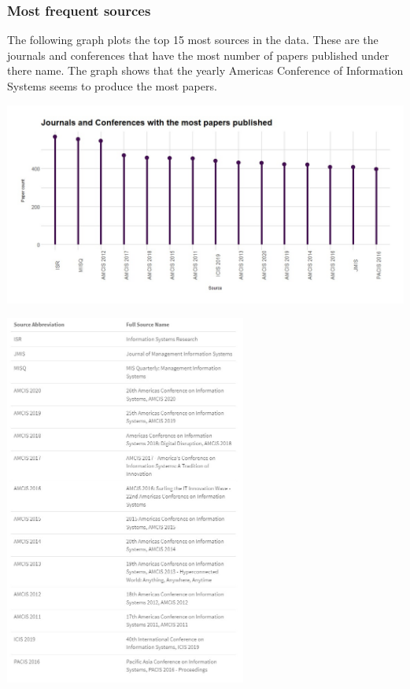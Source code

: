 \documentclass[
  letterpaper,
  DIV=11,
  numbers=noendperiod]{scrartcl}
\begin{document}
\hypertarget{most-frequent-sources}{%
\subsubsection{Most frequent sources}\label{most-frequent-sources}}

The following graph plots the top 15 most sources in the data. These are
the journals and conferences that have the most number of papers
published under there name. The graph shows that the yearly Americas
Conference of Information Systems seems to produce the most papers.

\includegraphics[width=5.72917in,height=\textheight]{images/JournalsandConfrMostPapersPublished.jpg}

\includegraphics[width=3.125in,height=\textheight]{images/freqSourceAbrv.jpg}
\end{document}
